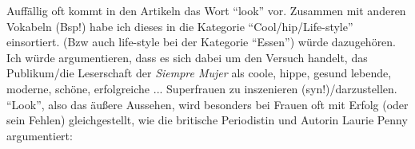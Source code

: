 \begin{comment}
  \item English discourse markers as part of the Spanish text  (``anyway'', ``pros and contras'', ``must'', etc.)%
  \item Music stuff (v.a. Genres)
  \item "One night stand"/sex stuff (72933) (und Dating) --> sex sells! (aber warum auf EN?)
  \item Essen:
    \begin{itemize}
      \item Kochrezepte bzw. Werbung/Diättips: auf Spanisch, die Englische Übersetzung in Klammern (damit die Menschen es im Supermarkt finden und kaufen können)
presumption: people living in the US would know (specific) foods better by there English name;
people living in the US should be able to buy stuff under their English name, since it's unlikely that the supermarket has Spanish labels
e.g. if the food is not very popular in their country of origin; (couldn't say that for baking soda probably though^^)
      \item lifestyle shit (``baby greens'', ``pavo wild'', ``gluten free'', ``nutritional yeast''..)
Organic/healthy/lifestyle bla
      \item Zeug, das spezifisch US-amerikanisch ist (oder relativ krass mit der Kultur in Verbindung gebracht wird): ``brownies'', ``cheesecake''; (was ist mit ``black licorice''??)
      \item auch lifestyle aber mehr das "immer unterwegs, schwerbeschäftigt, cool, hipster bla": ``coffeehouse'', ``dip'', ``snack'', ``brunch''
      \item Diätkram: v.a. ``light'', aber auch ``thigh gap''
    \end{itemize}
\end{comment}

Auffällig oft kommt in den Artikeln das Wort ``look'' vor.
Zusammen mit anderen Vokabeln (Bsp!) habe ich dieses in die Kategorie ``Cool/hip/Life-style'' einsortiert.
(Bzw auch life-style bei der Kategorie ``Essen'') würde dazugehören.
Ich würde argumentieren, dass es sich dabei um den Versuch handelt, das Publikum/die Leserschaft der \textit{Siempre Mujer} als coole, hippe, gesund lebende, moderne, schöne, erfolgreiche ... Superfrauen zu inszenieren (syn!)/darzustellen.
``Look'', also das äußere Aussehen, wird besonders bei Frauen oft mit Erfolg (oder sein Fehlen) gleichgestellt, wie die britische Periodistin und Autorin Laurie Penny argumentiert:

